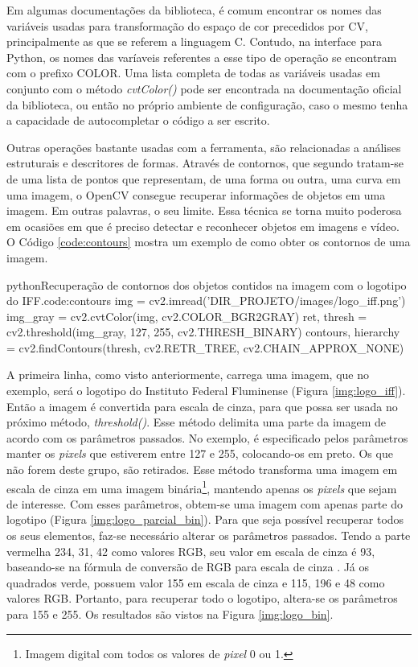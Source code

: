 Em algumas documentações da biblioteca, é comum encontrar os nomes das variáveis usadas para transformação do espaço de cor precedidos por CV, principalmente as que se referem a linguagem C. Contudo, na interface para Python, os nomes das varíaveis referentes a esse tipo de operação se encontram com o prefixo COLOR. Uma lista completa de todas as variáveis usadas em conjunto com o método \textit{cvtColor()} pode ser encontrada na documentação oficial da biblioteca, ou então no próprio ambiente de configuração, caso o mesmo tenha a capacidade de autocompletar o código a ser escrito.

Outras operações bastante usadas com a ferramenta, são relacionadas a análises estruturais e descritores de formas. Através de contornos, que segundo  tratam-se de uma lista de pontos que representam, de uma forma ou outra, uma curva em uma imagem, o OpenCV consegue recuperar informações de objetos em uma imagem. Em outras palavras, o seu limite. Essa técnica se torna muito poderosa em ocasiões em que é preciso detectar e reconhecer objetos em imagens e vídeo. O Código \ref{code:contours} mostra um exemplo de como obter os contornos de uma imagem.

\begin{code}{python}{Recuperação de contornos dos objetos contidos na imagem com o logotipo do IFF.}{code:contours}
img = cv2.imread('DIR_PROJETO/images/logo_iff.png')
img_gray = cv2.cvtColor(img, cv2.COLOR_BGR2GRAY)
ret, thresh = cv2.threshold(img_gray, 127, 255, cv2.THRESH_BINARY)
contours, hierarchy = cv2.findContours(thresh, cv2.RETR_TREE, cv2.CHAIN_APPROX_NONE)
\end{code}

A primeira linha, como visto anteriormente, carrega uma imagem, que no exemplo, será o logotipo do Instituto Federal Fluminense (Figura \ref{img:logo_iff}). Então a imagem é convertida para escala de cinza, para que possa ser usada no próximo método, \textit{threshold()}. Esse método delimita uma parte da imagem de acordo com os parâmetros passados. No exemplo, é especificado pelos parâmetros manter os \textit{pixels} que estiverem entre 127 e 255, colocando-os em preto. Os que não forem deste grupo, são retirados. Esse método transforma uma imagem em escala de cinza em uma imagem binária\footnote{Imagem digital com todos os valores de \textit{pixel} 0 ou 1.}, mantendo apenas os \textit{pixels} que sejam de interesse. Com esses parâmetros, obtem-se uma imagem com apenas parte do logotipo (Figura \ref{img:logo_parcial_bin}). Para que seja possível recuperar todos os seus elementos, faz-se necessário alterar os parâmetros passados. Tendo a parte vermelha 234, 31, 42 como valores RGB, seu valor em escala de cinza é 93, baseando-se na fórmula de conversão de RGB para escala de cinza \cite{KUMAR}. Já os quadrados verde, possuem valor 155 em escala de cinza e 115, 196 e 48 como valores RGB. Portanto, para recuperar todo o logotipo, altera-se os parâmetros para 155 e 255. Os resultados são vistos na Figura \ref{img:logo_bin}.

